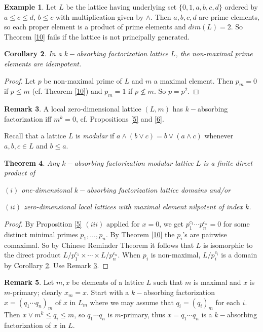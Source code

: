 \documentclass{amsart}
\theoremstyle{plain}
\newtheorem{theorem}{Theorem}%
\newtheorem{corollary}[theorem]{Corollary}
\theoremstyle{definition}
\newtheorem{example}[theorem]{Example}
\newtheorem{remark}[theorem]{Remark}
\theoremstyle{remark}
\begin{document}
\begin{example}\label{e2}
Let   $L$ be the lattice  having underlying set $\{0,1,a,b,c,d \}$ ordered by $a\leq c\leq d$,  $b\leq c$ with multiplication  given by
$\wedge$. Then $a,b,c,d$ are prime elements, so each proper element is a product of prime elements and $dim(L)=2$. So Theorem \ref{10} fails if the lattice is not principally generated. 
\end{example}

\begin{corollary}\label{14}
In a $k-$absorbing factorization lattice $L$, 
the non-maximal prime elements are idempotent.
\end{corollary}
\begin{proof}
Let $p$ be non-maximal prime of $L$ and $m$ a maximal element.
Then $p_m=0$ if $p\leq m$ (cf. Theorem \ref{10}) and 
$p_m=1$ if $p\not\leq m$. So $p=p^2$.


\end{proof}
\begin{remark}\label{15}
A   local zero-dimensional lattice $(L,m)$   has $k-$absorbing factorization iff $m^k=0$, cf. Propositions \ref{5} and \ref{6}.
\end{remark}
 
 Recall that a lattice $L$ is  \emph{modular} if $ a\wedge(b\vee c)=b\vee(a\wedge c) $ whenever $a,b,c\in L$ and $b\leq a$.

\begin{theorem}\label{12}
Any $k-$absorbing factorization modular lattice $L$  is a finite direct product of 

$(i)$ one-dimensional $k-$absorbing factorization lattice domains  and/or

$(ii)$ zero-dimensional  local lattices  with  maximal element  nilpotent of index $k$.
\end{theorem}
\begin{proof}
By Proposition \ref{5} $(iii)$ applied for $x=0$, we get 
$p_1^{c_1}\cdots p_n^{c_n}=0$ for some distinct minimal primes $p_1,\ldots,p_n$. By Theorem \ref{10} the  $p_i$'s are pairwise comaximal. So by Chinese Reminder Theorem it follows that $L$ is isomorphic to the direct product 
$L/p_1^{c_1} \times  \cdots \times  L/p_n^{c_n}$. When $p_i$ is non-maximal, $L/p_i^{c_i}$ is a domain by Corollary \ref{14}. Use Remark \ref{15}.
\end{proof}

\begin{remark}\label{16}
Let $m,x$ be elements of a lattice $L$ such that $m$ is maximal and $x$ is $m$-primary; clearly $x_m=x$.
Start with a $k-$absorbing factorization $x=(q_1\cdots q_n)_m$ of $x$ in $L_m$ where we may assume that $q_i=(q_i)_m$ for each $i$. Then  $x\vee m^k\leq q_i\leq m$, so $q_1\cdots q_n$ is $m$-primary, thus $x=q_1\cdots q_n$ is a $k-$absorbing factorization of $x$ in $L$.
\end{remark}
\end{document}
